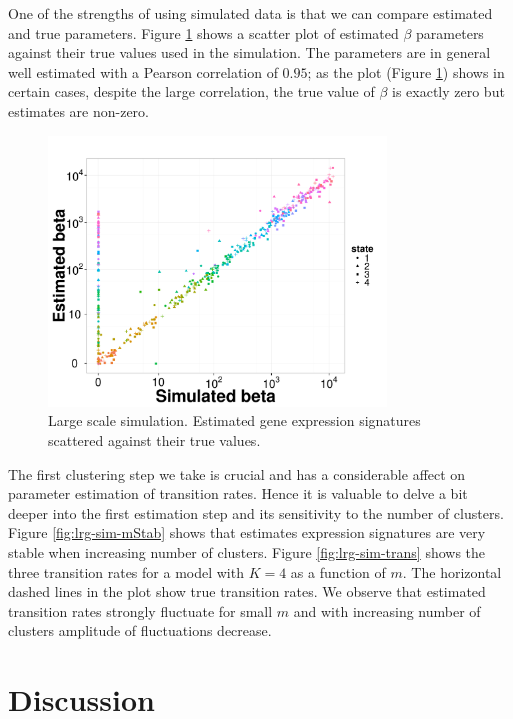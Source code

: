 One of the strengths of using simulated data is that we can compare estimated and true parameters. Figure \ref{fig:lrg-sim-scatter-b} shows a scatter plot of estimated $\beta$ parameters against their true values used in the simulation. The parameters are in general well estimated with a Pearson correlation of $0.95$; as the plot (Figure \ref{fig:lrg-sim-scatter-b}) shows in certain cases, despite the large correlation, the true value of $\beta$ is exactly zero but estimates are non-zero. 

\begin{figure}[!h]
  \centering
  \includegraphics[width=0.8\textwidth]{pics/beta-sim.pdf}
  \caption{Large scale simulation. Estimated gene expression signatures scattered against their true values. }
  \label{fig:lrg-sim-scatter-b}
\end{figure}

The first clustering step we take is crucial and has a considerable affect on parameter estimation of transition rates. Hence it is valuable to delve a bit deeper into the first estimation step and its sensitivity to the number of clusters. Figure \ref{fig:lrg-sim-mStab} shows that estimates expression signatures are very stable when increasing number of clusters. Figure \ref{fig:lrg-sim-trans} shows the three transition rates for a model with $K=4$ as a function of $m$. The horizontal dashed lines in the plot show true transition rates. We observe that estimated transition rates strongly fluctuate for small $m$ and with increasing number of clusters amplitude of fluctuations decrease. 

\section{Discussion}
\label{sec:discussion}


